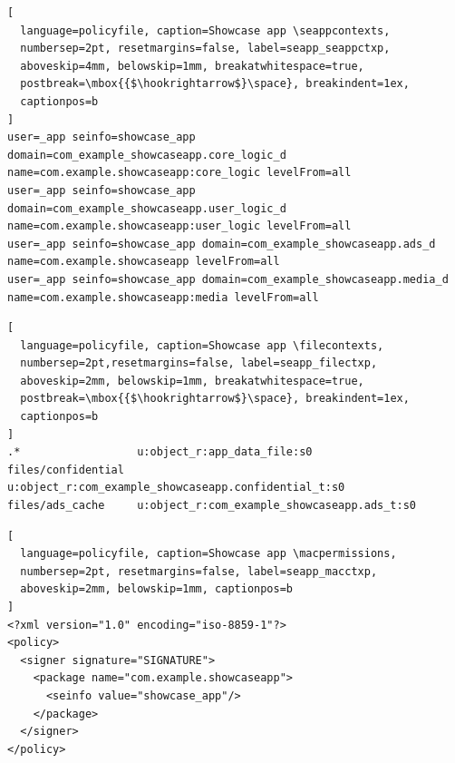 \begin{lstlisting}[
  language=policyfile, caption=Showcase app \seappcontexts,
  numbersep=2pt, resetmargins=false, label=seapp_seappctxp,
  aboveskip=4mm, belowskip=1mm, breakatwhitespace=true,
  postbreak=\mbox{{$\hookrightarrow$}\space}, breakindent=1ex,
  captionpos=b
]
user=_app seinfo=showcase_app domain=com_example_showcaseapp.core_logic_d name=com.example.showcaseapp:core_logic levelFrom=all
user=_app seinfo=showcase_app domain=com_example_showcaseapp.user_logic_d name=com.example.showcaseapp:user_logic levelFrom=all
user=_app seinfo=showcase_app domain=com_example_showcaseapp.ads_d name=com.example.showcaseapp levelFrom=all
user=_app seinfo=showcase_app domain=com_example_showcaseapp.media_d name=com.example.showcaseapp:media levelFrom=all
\end{lstlisting}
\begin{lstlisting}[
  language=policyfile, caption=Showcase app \filecontexts,
  numbersep=2pt,resetmargins=false, label=seapp_filectxp,
  aboveskip=2mm, belowskip=1mm, breakatwhitespace=true,
  postbreak=\mbox{{$\hookrightarrow$}\space}, breakindent=1ex,
  captionpos=b
]
.*                  u:object_r:app_data_file:s0
files/confidential  u:object_r:com_example_showcaseapp.confidential_t:s0
files/ads_cache     u:object_r:com_example_showcaseapp.ads_t:s0
\end{lstlisting}
\begin{lstlisting}[
  language=policyfile, caption=Showcase app \macpermissions,
  numbersep=2pt, resetmargins=false, label=seapp_macctxp,
  aboveskip=2mm, belowskip=1mm, captionpos=b
]
<?xml version="1.0" encoding="iso-8859-1"?>
<policy>
  <signer signature="SIGNATURE">
    <package name="com.example.showcaseapp">
      <seinfo value="showcase_app"/>
    </package>
  </signer>
</policy>
\end{lstlisting}
